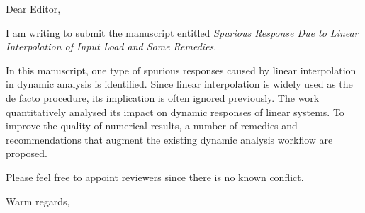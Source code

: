 \documentclass[a4paper,11pt]{letter}
\begin{document}
\onehalfspacing
\begin{letter}{}
\address{1.127, IRIS Adlershof\\Humboldt-Universität zu Berlin\\Berlin, Germany, 12489}

\opening{Dear Editor,}

I am writing to submit the manuscript entitled \textit{Spurious Response Due to Linear Interpolation of Input Load and Some Remedies}.

In this manuscript, one type of spurious responses caused by linear interpolation in dynamic analysis is identified. Since linear interpolation is widely used as the de facto procedure, its implication is often ignored previously. The work quantitatively analysed its impact on dynamic responses of linear systems. To improve the quality of numerical results, a number of remedies and recommendations that augment the existing dynamic analysis workflow are proposed.

Please feel free to appoint reviewers since there is no known conflict.

\signature{Theodore Chang}

\closing{Warm regards,}
\end{letter}
\clearpage
\end{document}

